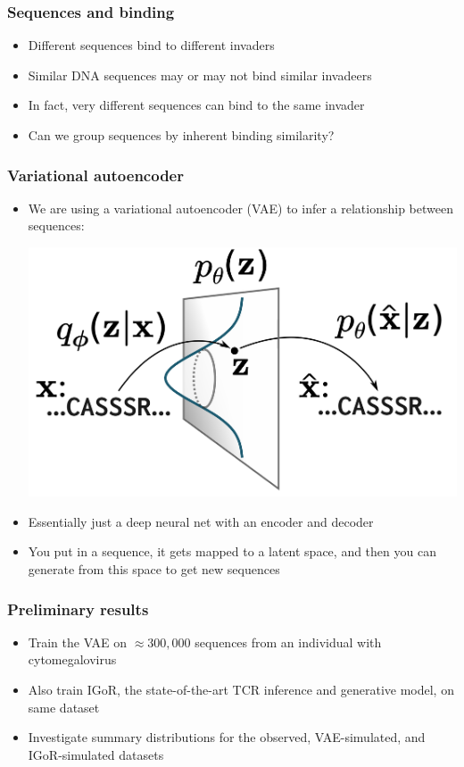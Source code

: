 \documentclass[mathserif,compress]{beamer}
\renewcommand\;{\,}
\begin{document}
\begin{frame}\frametitle{Sequences and binding}
\begin{itemize}
\item
Different sequences bind to different invaders
\bigskip
\item
Similar DNA sequences may or may not bind similar invadeers
\item
\bigskip
In fact, very different sequences can bind to the same invader
\bigskip
\item
Can we group sequences by inherent binding similarity?
\end{itemize}
\end{frame}

\begin{frame}\frametitle{Variational autoencoder}
\begin{itemize}
\item
We are using a variational autoencoder (VAE) to infer a relationship between sequences:
\begin{center}
\includegraphics[width=0.7\linewidth]{Images/VAE.png}
\end{center}
\item
Essentially just a deep neural net with an encoder and decoder
\bigskip
\item
You put in a sequence, it gets mapped to a latent space, and then you can generate from this space to get new sequences

\end{itemize}
\end{frame}

\begin{frame}\frametitle{Preliminary results}
\begin{itemize}
\item
Train the VAE on $\approx300,000$ sequences from an individual with cytomegalovirus
\bigskip
\item
Also train IGoR, the state-of-the-art TCR inference and generative model, on same dataset
\bigskip
\item
Investigate summary distributions for the observed, VAE-simulated, and IGoR-simulated datasets 
\end{itemize}
\end{frame}
\end{document}
